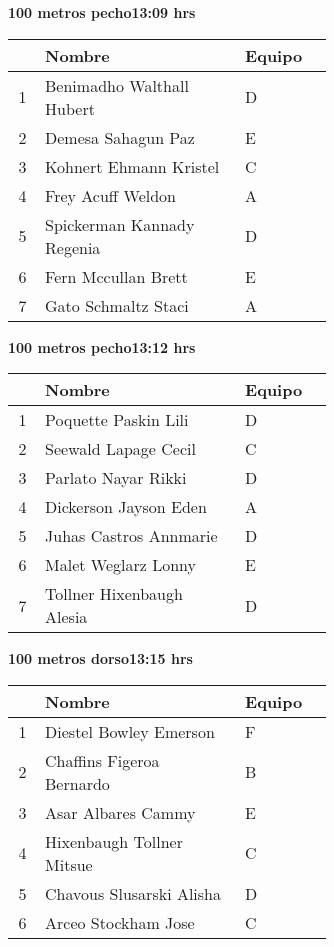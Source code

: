 \begin{minipage}{0.95\linewidth}
\begin{center}
\textbf{
100 metros pecho\hspace{1cm}13:09 hrs}
\end{center}
\begin{tabular}{cp{0.63\linewidth}l}
\hline
& \textbf{Nombre} & \textbf{Equipo} \\ \hline
1 & Benimadho Walthall Hubert & D \\ 
2 & Demesa Sahagun Paz & E \\ 
3 & Kohnert Ehmann Kristel & C \\ 
4 & Frey Acuff Weldon & A \\ 
5 & Spickerman Kannady Regenia & D \\ 
6 & Fern Mccullan Brett & E \\ 
7 & Gato Schmaltz Staci & A \\ 
\end{tabular}
\end{minipage}
\begin{minipage}{0.95\linewidth}
\begin{center}
\textbf{
100 metros pecho\hspace{1cm}13:12 hrs}
\end{center}
\begin{tabular}{cp{0.63\linewidth}l}
\hline
& \textbf{Nombre} & \textbf{Equipo} \\ \hline
1 & Poquette Paskin Lili & D \\ 
2 & Seewald Lapage Cecil & C \\ 
3 & Parlato Nayar Rikki & D \\ 
4 & Dickerson Jayson Eden & A \\ 
5 & Juhas Castros Annmarie & D \\ 
6 & Malet Weglarz Lonny & E \\ 
7 & Tollner Hixenbaugh Alesia & D \\ 
\end{tabular}
\end{minipage}
\begin{minipage}{0.95\linewidth}
\begin{center}
\textbf{
100 metros dorso\hspace{1cm}13:15 hrs}
\end{center}
\begin{tabular}{cp{0.63\linewidth}l}
\hline
& \textbf{Nombre} & \textbf{Equipo} \\ \hline
1 & Diestel Bowley Emerson & F \\ 
2 & Chaffins Figeroa Bernardo & B \\ 
3 & Asar Albares Cammy & E \\ 
4 & Hixenbaugh Tollner Mitsue & C \\ 
5 & Chavous Slusarski Alisha & D \\ 
6 & Arceo Stockham Jose & C \\ 
\end{tabular}
\end{minipage}
